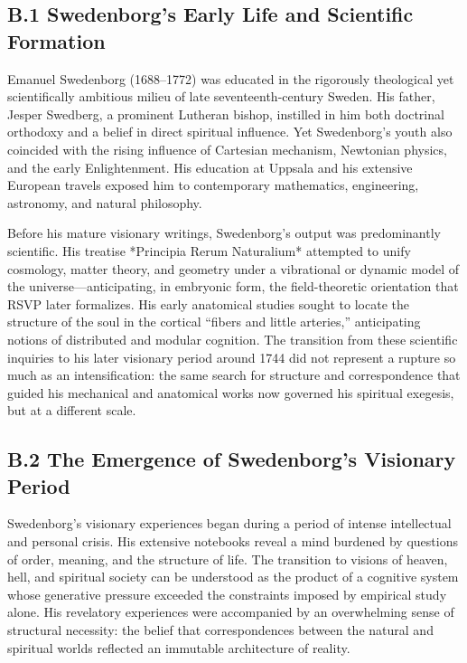 \documentclass[12pt]{article}
\begin{document}
\subsection*{B.1 Swedenborg’s Early Life and Scientific Formation}

Emanuel Swedenborg (1688–1772) was educated in the rigorously theological yet 
scientifically ambitious milieu of late seventeenth-century Sweden. His father, 
Jesper Swedberg, a prominent Lutheran bishop, instilled in him both doctrinal 
orthodoxy and a belief in direct spiritual influence. Yet Swedenborg’s youth 
also coincided with the rising influence of Cartesian mechanism, Newtonian 
physics, and the early Enlightenment. His education at Uppsala and his extensive 
European travels exposed him to contemporary mathematics, engineering, 
astronomy, and natural philosophy.

Before his mature visionary writings, Swedenborg’s output was predominantly 
scientific. His treatise *Principia Rerum Naturalium* attempted to unify 
cosmology, matter theory, and geometry under a vibrational or dynamic model of 
the universe—anticipating, in embryonic form, the field-theoretic orientation 
that RSVP later formalizes. His early anatomical studies sought to locate the 
structure of the soul in the cortical “fibers and little arteries,” anticipating 
notions of distributed and modular cognition. The transition from these 
scientific inquiries to his later visionary period around 1744 did not represent 
a rupture so much as an intensification: the same search for structure and 
correspondence that guided his mechanical and anatomical works now governed his 
spiritual exegesis, but at a different scale.

\subsection*{B.2 The Emergence of Swedenborg’s Visionary Period}

Swedenborg’s visionary experiences began during a period of intense intellectual 
and personal crisis. His extensive notebooks reveal a mind burdened by 
questions of order, meaning, and the structure of life. The transition to 
visions of heaven, hell, and spiritual society can be understood as the product 
of a cognitive system whose generative pressure exceeded the constraints 
imposed by empirical study alone. His revelatory experiences were accompanied by 
an overwhelming sense of structural necessity: the belief that correspondences 
between the natural and spiritual worlds reflected an immutable architecture of 
reality.
\end{document}
